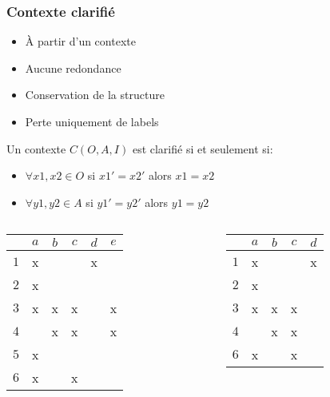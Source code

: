 \documentclass{beamer}
\begin{document}
\begin{frame}
	\frametitle{Contexte clarifié}
	 {
		\begin{itemize}
			\item À partir d'un contexte
			\item Aucune redondance
			\item Conservation de la structure
			\item Perte uniquement de labels
		\end{itemize}
		\begin{definition}
			Un contexte $C(O, A, I)$ est clarifié si et seulement si:
			\begin{itemize}
				\item $\forall x1, x2 \in O$ si ${x1}' = {x2}'$ alors $x1 = x2$
				\item $\forall y1, y2 \in A$ si ${y1}' = {y2}'$ alors $y1 = y2$
			\end{itemize}
		\end{definition}
	} {
		\begin{columns}[T] %
			\begin{column}{.48\textwidth}
				\begin{center}
				\begin{tabular}{ l | c c c c c }
					 & $a$ & $b$ & $c$ & $d$ & $e$ \\
					\hline
					$1$ & x & & & x & \\
					$2$ & x & & & & \\
					$3$ & x & x & x & & x \\
					$4$ & & x & x & & x \\
					$5$ & x & & & & \\
					$6$ & x & & x & & \\
				\end{tabular}
				\end{center}
			\end{column}%
			\hfill%
			\begin{column}{.48\textwidth}
				\begin{center}
				\begin{tabular}{ l | c c c c }
					 & $a$ & $b$ & $c$ & $d$ \\
					\hline
					$1$ & x & & & x \\
					$2$ & x & & & \\
					$3$ & x & x & x & \\
					$4$ & & x & x & \\
					$6$ & x & & x & \\
				\end{tabular}
				\end{center}
			\end{column}%
		\end{columns}
	}
\end{frame}
\end{document}
